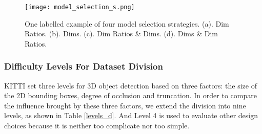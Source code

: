 \begin{figure}[h]		
	\texttt{[image: model\_selection\_s.png]}
	\caption{One labelled example of four model selection strategies. (a). Dim Ratios. (b). Dims. (c). Dim Ratios \& Dims. (d). Dims \& Dim Ratios. }
	\centering
	\label{figure:model_selection_s}
\end{figure}

\subsubsection{Difficulty Levels For Dataset Division}
KITTI set three levels for 3D object detection based on three factors: the size of the 2D bounding boxes, degree of occlusion and truncation. In order to compare the influence brought by these three factors, we extend the division into nine levels, as shown in Table \ref{levels_d}. And Level 4 is used to evaluate other design choices because it is neither too complicate nor too simple.

\renewcommand{\arraystretch}{1.0}
\begin{table}[H]
	\centering
	\caption{Levels of difficulty. Level 2, 6, and 8 corresponds to the Easy, Moderate, and Hard defined by KITTI \cite{Geiger2012CVPR}.}
	\label{levels_d}
\end{table}

